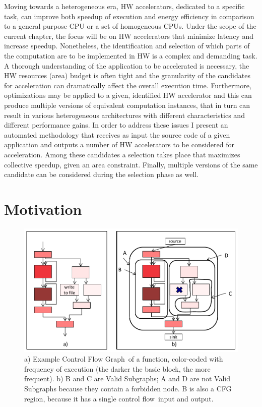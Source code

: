 \documentclass[]{usiinfthesis}
\newcommand{\controlflow}{control flow}
\newcommand{\CFG}{Control Flow Graph}
\begin{document}
Moving towards a heterogeneous era, HW accelerators, dedicated to a specific task, can
improve both speedup of execution and energy efficiency in comparison to a general 
purpose CPU or a set of homogeneous CPUs. 
Under the scope of the current chapter, the focus will be on HW accelerators that minimize
latency and increase speedup. Nonetheless, the identification and selection 
of which parts of the computation are to be implemented in HW is a complex and demanding task. 
A thorough understanding of the application to be accelerated is necessary, the HW resources
(area) budget is often tight and the granularity of the candidates for acceleration 
can dramatically affect the overall execution time. Furthermore, optimizations may be applied
to a given, identified HW accelerator and this can produce multiple versions of equivalent
computation instances, that in turn can result in various heterogeneous architectures with different
characteristics and different performance gains.
In order to address these issues I present an automated methodology
that receives as input the source code of a given application and outputs a number of 
HW accelerators to be considered for acceleration. Among these candidates a selection takes 
place that maximizes collective speedup, given an area constraint. Finally, 
multiple versions of the same candidate can be considered during the selection phase as well.

\section{Motivation}
\label{sec:mot}


\begin{figure}[t]
\centering
\includegraphics[width= .7 \linewidth]{Figs/cfg_example}
\caption{a) Example \CFG\ of a function, color-coded with frequency
  of execution (the darker the basic block, the more frequent). b) B
  and C are Valid Subgraphs; A and D are not Valid Subgraphs because
  they contain a forbidden node. B is also a CFG region, because it has a
  single \controlflow\ input and output.}
\label{fig:cfg-example}
\end{figure}
\end{document}
